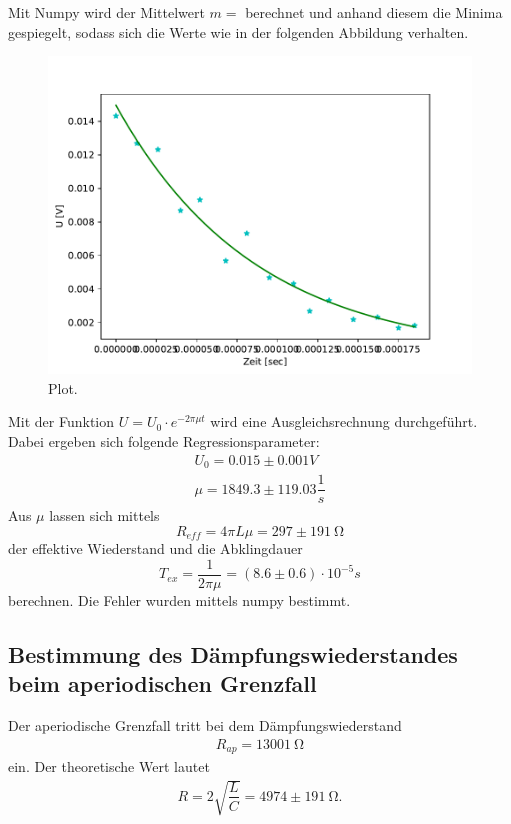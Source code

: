  Mit Numpy wird der Mittelwert $m=$ berechnet und anhand diesem die Minima gespiegelt, 
  sodass sich die Werte wie in der folgenden Abbildung verhalten.
  \begin{figure}
    \centering
    \includegraphics{Python/plot1.pdf}
    \caption{Plot.}
    \label{fig:plot}
  \end{figure}
  Mit der Funktion $U=U_0\cdot e^{-2 \pi \mu t}$ wird eine Ausgleichsrechnung durchgeführt.
  Dabei ergeben sich folgende Regressionsparameter:
  \begin{align*}
    U_0=0.015\pm 0.001 V\\
    \mu = 1849.3 \pm 119.03 \dfrac{1}{s}
  \end{align*}
  Aus $\mu$ lassen sich mittels 
  \begin{equation*}
    R_{eff}=4 \pi L \mu = 297 \pm 19 \SI{1}{\ohm}
  \end{equation*}
  der effektive Wiederstand und die Abklingdauer
  \begin{equation*}
    T_{ex}=\dfrac{1}{2\pi \mu} = (8.6 \pm 0.6)\cdot 10^{-5} s
  \end{equation*}
  berechnen. Die Fehler wurden mittels numpy bestimmt.

\subsection{Bestimmung des Dämpfungswiederstandes beim aperiodischen Grenzfall}
  Der aperiodische Grenzfall tritt bei dem Dämpfungswiederstand 
  \begin{align*}
    R_{ap}=1300 \SI{1}{\ohm}
  \end{align*}
  ein. Der theoretische Wert lautet
  \begin{align*}
    R=2 \sqrt{\dfrac{L}{C}}=4974\pm19 \SI{1}{\ohm}.
  \end{align*}

